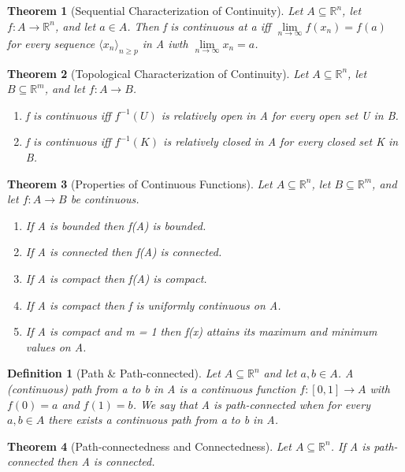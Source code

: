 \documentclass[11pt, oneside]{book}
\theoremstyle{break}
\newtheorem{thm}{Theorem}[section]
\newtheorem{defn}{Definition}[section]
\newcommand{\bb}[1]{\mathbb{#1}}		%
\begin{document}
\begin{thm}[Sequential Characterization of Continuity]
	Let $A \subseteq \bb{R}^n$, let $f: A \to \bb{R}^n$, and let $a \in A$. Then f is continuous at a iff $\lim\limits_{n \to \infty} f(x_n) = f(a)$ for every sequence $\langle x_n \rangle_{n \geq p}$ in A iwth $\lim\limits_{n \to \infty} x_n = a$.
\end{thm}

\begin{thm}[Topological Characterization of Continuity]
	Let $A \subseteq \bb{R}^n$, let $B \subseteq \bb{R}^m$, and let $f: A \to B$.
	\begin{enumerate}
		\item f is continuous iff $f^{-1}(U)$ is relatively open in A for every open set U in B.
		\item f is continuous iff $f^{-1}(K)$ is relatively closed in A for every closed set K in B.
	\end{enumerate}
\end{thm}

\begin{thm}[Properties of Continuous Functions]
	Let $A \subseteq \bb{R}^n$, let $B \subseteq \bb{R}^m$, and let $f:A \to B$ be continuous.
	\begin{enumerate}
		\item If A is bounded then f(A) is bounded.
		\item If A is connected then f(A) is connected.
		\item If A is compact then f(A) is compact.
		\item If A is compact then f is uniformly continuous on A.
		\item If A is compact and m = 1 then f(x) attains its maximum and minimum values on A.
	\end{enumerate}
\end{thm}

\begin{defn}[Path \& Path-connected]
	Let $A \subseteq \bb{R}^n$ and let $a, b \in A$. A (continuous) path from a to b in A is a continuous function $f: [0, 1] \to A$ with $f(0) = a$ and $f(1) = b$. We say that A is path-connected when for every $a, b \in A$ there exists a continuous path from a to b in A.
\end{defn}

\begin{thm}[Path-connectedness and Connectedness]
	Let $A \subseteq \bb{R}^n$. If A is path-connected then A is connected.
\end{thm}
\end{document}
